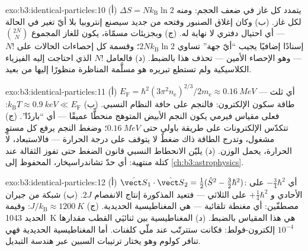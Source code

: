 \begin{solution}{exo:b3:identical-particles:10}
(أ) يتمدد كل غاز في ضعف الحجم: ومنه $\Delta S =
Nk_{\text{B}}\ln2$ لكل غاز. (ب) وكان إغلاق الصنبور وفتحه من جديد
سيصنع إنتروبيا بلا أيّ تغير في الحالة ---
أي احتيال دفتري لا نهاية له. (ج) وبجزيئات مسمّاة، يكون
للغاز المجموع $\binom{2N}{N}$ إسنادًا إضافيًا يجيب ``أيّ جهة''
تساوي $2Nk_{\text{B}}\ln2$؛ وقسمة كل إحصاءات الحالات على $N!$ ---
وهو الإحصاء الأمين  --- تحذف هذا بالضبط.
(د) فالعامل $N!$ الذي احتاجت إليه الفيزياء الكلاسيكية ولم تستطع تبريره
هو مسلَّمة المناظرة منظورًا إليها من بعيد.
\end{solution}

\begin{solution}{exo:b3:identical-particles:11}
(أ) $E_{\text{F}} = \hbar^2(3\pi^2n_{\text{e}})^{2/3}/2m_{\text{e}}
\approx \qty{0.16}{MeV}$ --- أي ثلث طاقة سكون
الإلكترون: فالنجم على حافة النظام النسبي. (ب)
$k_{\text{B}}T \approx \qty{0.9}{keV} \ll E_{\text{F}}$: فعلى مقياس
فيرمي يكون النجم الأبيض المتوهج منحطًّا عميقًا --- أي ``باردًا''.
(ج) تتكدّس الإلكترونات على طريقة باولي حتى
$\qty{0.16}{MeV}$؛ وضغط النجم يرفع كل مستوٍ مشغول،
وتدرج الطاقة ذاك ضغطٌ لا يتوقف على درجة
الحرارة --- فالاستبعاد، لا الحرارة، يحمل الوزن. (د)
يليّن الانحطاط النسبي قانون الضغط حتى تفوز الثقالة
عند كتلة منتهية: أي حدّ تشاندراسيخار، المحفوظ إلى
\cref{ch:b3:astrophysics}.
\end{solution}

\begin{solution}{exo:b3:identical-particles:12}
(أ) $\hat{\vect S}_1\cdot\hat{\vect S}_2 = \tfrac12(\hat S^2 -
\tfrac32\hbar^2)$: أي $-\tfrac34\hbar^2$ على الأحادي و
$+\tfrac14\hbar^2$ على الثلاثي --- فتعيد  المذكورة
إنتاج الانفصام $2J$. (ب) شبكة من جيران مصطفّين:
أي مغنطة تلقائية --- هي المغناطيسية الحديدية. (ج) $J/k_{\text{B}}
\approx \qty{1200}{K}$: وقيمة الحديد \qty{1043}{K} هي هذا المقياس
بالضبط. (د) المغناطيسية بين ثنائيَي القطب مقدارها $10^{-4}$ إلكترون-فولط: فكانت
ستترتّب عند ملّي كلفنات. أما المغناطيسية الحديدية فهي تنافر كولوم
وهو يختار ترتيبات السبين عبر هندسة التبديل.
\end{solution}

